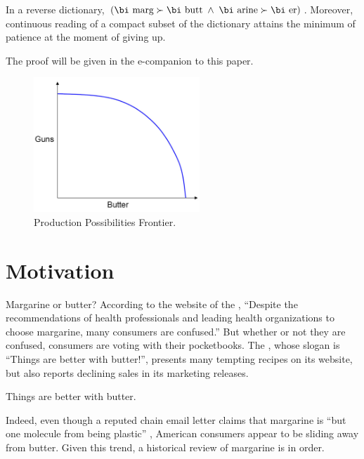\documentclass[mnsc,blindrev]{informs3}
\begin{document}
\begin{theorem}
\label{marg-butt-th}
In a reverse dictionary, $(\mbox{\bi marg}\succ\mbox{\bi butt\/}\; \land\;  
\mbox{\bi arine}\succ\mbox{\bi er})$.
Moreover, continuous reading of a compact subset of the dictionary
attains the minimum of patience at the moment of giving up.
\end{theorem}

The proof will be given in the e-companion to this paper.



\begin{figure}[t]
\begin{center}
\includegraphics[height=2in]{Sample-Figure.pdf}
\caption{Production Possibilities Frontier.} \label{frontier}
\end{center}
\end{figure}

\section{Motivation}

Margarine or butter? According to the website of the 
\cite{namm}, ``Despite the
recommendations of health professionals and leading health
organizations to choose margarine, many consumers are confused.''
But whether or not they are confused, consumers are voting with
their pocketbooks.  The 
\cite{abi}, whose
slogan is ``Things are better with butter!'', presents many tempting
recipes on its website, but also reports declining sales in its
marketing releases.  

\begin{hypothesis}
Things are better with butter.
\end{hypothesis}

Indeed, even though a reputed chain email letter claims that margarine is ``but 
one molecule from being plastic'' 
\citep{btc}, 
American consumers appear to be
sliding away from butter. Given this trend, a historical review of
margarine is in order.
\end{document}
